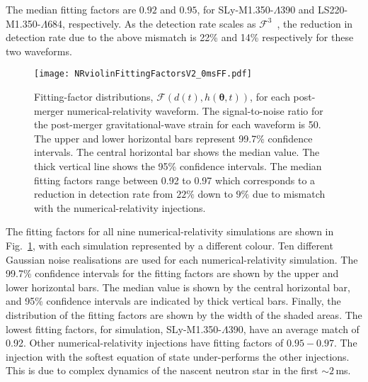 \documentclass[../Thesis.tex]{subfiles}
\begin{document}
    The median fitting factors are $0.92$ and $0.95$, for SLy-M1.350-$\Lambda$390 and LS220-M1.350-$\Lambda$684, respectively. As the detection rate scales as $\mathcal{F}^3$~\cite{Apostolatos95}, the reduction in detection rate due to the above mismatch is 22\% and 14\% respectively for these two waveforms. \par
        \begin{figure}[H]
        \centering
        \texttt{[image: NRviolinFittingFactorsV2\_0msFF.pdf]}
        \caption{Fitting-factor distributions, $\mathcal{F}(d(t),h(\boldsymbol{\theta},t))$, for each post-merger numerical-relativity waveform. 
        The signal-to-noise ratio for the post-merger gravitational-wave strain for each waveform is 50. 
        The upper and lower horizontal bars represent 99.7\% confidence intervals. 
        The central horizontal bar shows the median value. 
        The thick vertical line shows the 95\% confidence intervals. 
        The median fitting factors range between 0.92 to 0.97 which corresponds to a reduction in detection rate from $22\%$ down to $9\%$ due to mismatch with the numerical-relativity injections.} 
        \label{fig:FittingFactors}
    \end{figure} 
    The fitting factors for all nine numerical-relativity simulations are shown in Fig.~\ref{fig:FittingFactors}, with each simulation represented by a  different colour.
    Ten different Gaussian noise realisations are used for each numerical-relativity simulation.
    The 99.7\% confidence intervals for the fitting factors are shown by the upper and lower horizontal bars.
    The median value is shown by the central horizontal bar, and 95\% confidence intervals are indicated by thick vertical bars.
    Finally, the distribution of the fitting factors are shown by the width of the shaded areas.
    The lowest fitting factors, for simulation, SLy-M1.350-$\Lambda$390, have an average match of 0.92. 
    Other numerical-relativity injections have fitting factors of $0.95-0.97$. 
    The injection with the softest equation of state under-performs the other injections. 
    This is due to complex dynamics of the nascent neutron star in the first $\sim 2\,$ms.
\par
    
\end{document}
